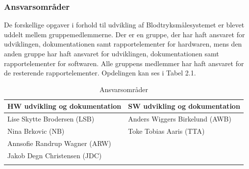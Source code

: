 \subsubsection{Ansvarsområder}
De forskellige opgaver i forhold til udvikling af Blodtryksmålesystemet er blevet uddelt mellem gruppemedlemmerne. Der er en gruppe, der har haft ansvaret for udviklingen, dokumentationen samt rapportelementer for hardwaren, mens den anden gruppe har haft ansvaret for udviklingen, dokumentationen samt rapportelementer for softwaren. Alle gruppens medlemmer har haft ansvaret for de resterende rapportelementer. Opdelingen kan ses i Tabel 2.1.    

\begin{longtabu} to 
	\textbf{HW udvikling og dokumentation} & \textbf{SW udvikling og dokumentation} \\[-1ex]
	\midrule
	Lise Skytte Brodersen (LSB) & Anders Wiggers Birkelund (AWB)\\[-1ex]
	Nina Brkovic (NB) & Toke Tobias Aaris (TTA) \\[-1ex]
	Annsofie Randrup Wagner (ARW) & \\[-1ex]
	Jakob Degn Christensen (JDC)& \\[-1ex]

	\caption{Ansvarsområder}
\end{longtabu}



